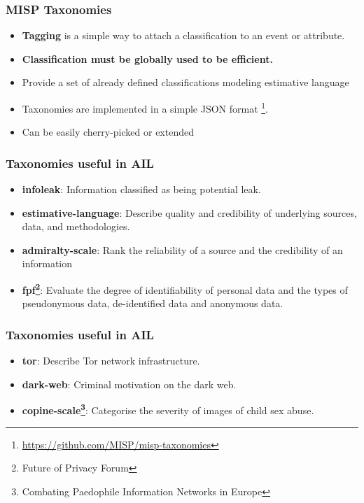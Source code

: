 \documentclass[10pt,aspectratio=169, colorlinks=true, linkcolor=circlBlue]{beamer}
\begin{document}
\begin{frame}
    \frametitle{MISP Taxonomies}
        \begin{itemize}
            \item {\bf Tagging} is a simple way to attach a classification to an event or attribute.
            \item {\bf Classification must be globally used to be efficient.}
            \item Provide a set of already defined classifications modeling estimative language
            \item Taxonomies are implemented in a simple JSON format \footnote{\url{https://github.com/MISP/misp-taxonomies}}.
            \item Can be easily cherry-picked or extended
        \end{itemize}
\end{frame}

\begin{frame}
    \frametitle{Taxonomies useful in AIL}
        \begin{itemize}
            \item {\bf infoleak}: Information classified as being potential leak.
            \item {\bf estimative-language}: Describe quality and credibility of underlying sources, data, and methodologies.
            \item {\bf admiralty-scale}: Rank the reliability of a source and the credibility of an information
            \item {\bf fpf\footnote{Future of Privacy Forum}}: Evaluate the degree of identifiability of personal data and the types of pseudonymous data, de-identified data and anonymous data.
        \end{itemize}
\end{frame}

\begin{frame}
    \frametitle{Taxonomies useful in AIL}
        \begin{itemize}
            \item {\bf tor}: Describe Tor network infrastructure.
            \item {\bf dark-web}: Criminal motivation on the dark web.
            \item {\bf copine-scale\footnote{Combating Paedophile Information Networks in Europe}}: Categorise the severity of images of child sex abuse.
        \end{itemize}
\end{frame}
\end{document}
